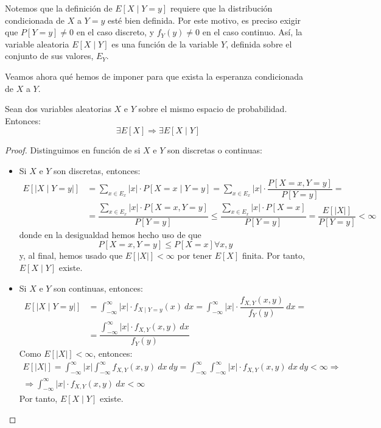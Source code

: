 Notemos que la definición de $E[X\mid Y = y]$ requiere que la distribución condicionada de $X$ a $Y = y$ esté bien definida. Por este motivo, es preciso exigir que $P[Y = y] \neq 0$ en el caso discreto, y $f_Y(y) \neq 0$ en el caso continuo. Así, la variable aleatoria $E[X\mid Y]$ es una función de la variable $Y$, definida sobre el conjunto de sus valores, $E_Y$.

Veamos ahora qué hemos de imponer para que exista la esperanza condicionada de $X$ a $Y$.
\begin{prop}
    Sean dos variables aleatorias $X$ e $Y$ sobre el mismo espacio de probabilidad. Entonces:
    \begin{equation*}
        \exists E[X] \Longrightarrow \exists E[X\mid Y]
    \end{equation*}
\end{prop}
\begin{proof}
    Distinguimos en función de si $X$ e $Y$ son discretas o continuas:
    \begin{itemize}
        \item Si $X$ e $Y$ son discretas, entonces:
        \begin{align*}
            E[|X\mid Y=y|] &= \sum_{x\in E_x} |x|\cdot P[X = x\mid Y = y] = \sum_{x\in E_x} |x|\cdot \dfrac{P[X = x, Y = y]}{P[Y = y]} =\\&= \dfrac{\sum_{x\in E_x} |x|\cdot P[X = x, Y = y]}{P[Y = y]} \leq \dfrac{\sum_{x\in E_x} |x|\cdot P[X = x]}{P[Y = y]} = \dfrac{E[|X|]}{P[Y = y]}<\infty
        \end{align*}
        donde en la desigualdad hemos hecho uso de que
        \begin{equation*}
            P[X = x, Y = y] \leq P[X = x] \forall x,y
        \end{equation*}
        y, al final, hemos usado que $E[|X|]<\infty$ por tener $E[X]$ finita. Por tanto, $E[X\mid Y]$ existe.

        \item Si $X$ e $Y$ son continuas, entonces:
        \begin{align*}
            E[|X\mid Y=y|] &= \int_{-\infty}^{\infty} |x|\cdot f_{X\mid Y=y}(x)~dx = \int_{-\infty}^{\infty} |x|\cdot \dfrac{f_{X,Y}(x,y)}{f_Y(y)}~dx =\\&= \dfrac{\int_{-\infty}^{\infty} |x|\cdot f_{X,Y}(x,y)~dx}{f_Y(y)}
        \end{align*}
        Como $E[|X|]<\infty$, entonces:
        \begin{multline*}
            E[|X|]=\int_{-\infty}^{\infty} |x|\int_{-\infty}^{\infty} f_{X,Y}(x,y)~dx~dy = \int_{-\infty}^{\infty} \int_{-\infty}^{\infty} |x|\cdot f_{X,Y}(x,y)~dx~dy<\infty
            \Longrightarrow\\\Longrightarrow
            \int_{-\infty}^{\infty} |x|\cdot f_{X,Y}(x,y)~dx<\infty
        \end{multline*}
        Por tanto, $E[X\mid Y]$ existe.
    \end{itemize}
\end{proof}

